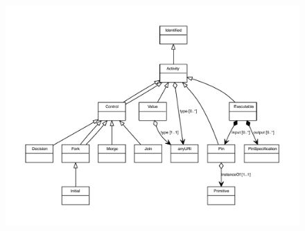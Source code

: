 \begin{figure}[ht]
\begin{center}
\includegraphics[scale=0.8]{uml/Initial_abstraction_hierarchy.pdf}
\end{center}
\end{figure}

